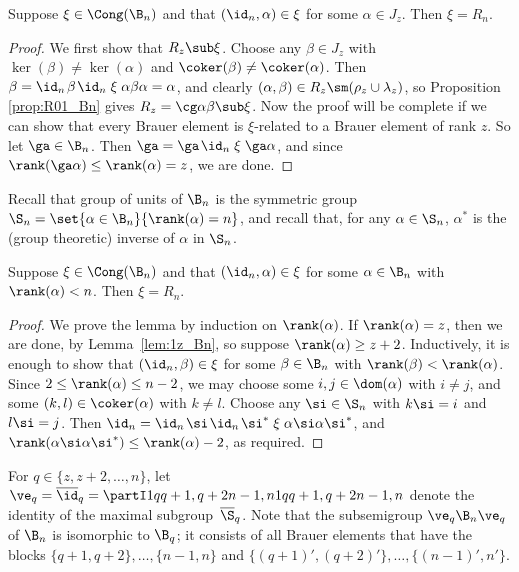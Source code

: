 \begin{lemma}\label{lem:1z_Bn}
Suppose $\xi\in\Cong(\B_n)$ and that $(\id_n,\alpha)\in\xi$ for some $\alpha\in J_z$.  Then $\xi=R_n$.
\end{lemma}

\begin{proof}
We first show that $R_z\sub\xi$.
Choose any $\beta\in J_z$ with $\ker(\beta)\not=\ker(\alpha)$ and $\coker(\beta)\not=\coker(\alpha)$.
Then $\beta=\id_n\;\!\beta\;\!\id_n\mathrel\xi\alpha\beta\alpha=\alpha$,
and clearly $(\alpha,\beta)\in R_z\sm(\rho_z\cup\lambda_z)$, so Proposition \ref{prop:R01_Bn} gives $R_z=\cg\alpha\beta\sub\xi$.
Now
the proof will be complete if we can show that every Brauer element is $\xi$-related to a Brauer element of rank $z$.  So let $\ga\in\B_n$.  Then $\ga=\ga\;\!\id_n\mathrel\xi\ga\alpha$, and since $\rank(\ga\alpha)\leq\rank(\alpha)=z$, we are done. \end{proof}

Recall that group of units of $\B_n$ is the symmetric group $\S_n=\set{\alpha\in\B_n}{\rank(\alpha)=n}$, and recall  that, for any $\alpha\in\S_n$, $\alpha^*$ is the (group theoretic) inverse of $\alpha$ in $\S_n$.


\begin{lemma}\label{lem:1q_Bn}
Suppose $\xi\in\Cong(\B_n)$ and that $(\id_n,\alpha)\in\xi$ for some $\alpha\in\B_n$ with $\rank(\alpha)<n$.  Then $\xi=R_n$.
\end{lemma}

\begin{proof} We prove the lemma by induction on $\rank(\alpha)$.  If $\rank(\alpha)=z$, then
we are done, by Lemma~\ref{lem:1z_Bn}, so suppose $\rank(\alpha)\geq z+2$.  Inductively, it is enough to show that $(\id_n,\beta)\in\xi$ for some $\beta\in\B_n$ with ${\rank(\beta)<\rank(\alpha)}$.  Since $2\leq\rank(\alpha)\leq n-2$, we may choose some $i,j\in\dom(\alpha)$ with $i\not=j$, and some $(k,l)\in\coker(\alpha)$ with $k\not=l$.  Choose any $\si\in\S_n$ with $k\si=i$ and $l\si=j$.  Then $\id_n = \id_n\;\!\si\;\!\id_n\;\!\si^* \mathrel\xi \alpha\si\alpha\si^*$, and $\rank(\alpha\si\alpha\si^*)\leq\rank(\alpha)-2$, as required. \end{proof}

For $q\in\{z,z+2,\dots,n\}$, let $\ve_q=\overline\id_q=\partI1q{q+1,q+2}{n-1,n}1q{q+1,q+2}{n-1,n}$
denote the identity of the maximal subgroup~$\overline{\S}_q$.
Note that the subsemigroup $\ve_q\B_n\ve_q$ of $\B_n$ is isomorphic to $\B_q$; it consists of all Brauer elements that have the blocks $\{q+1,q+2\},\ldots,\{n-1,n\}$ and $\{(q+1)',(q+2)'\},\ldots,\{(n-1)',n'\}$.



